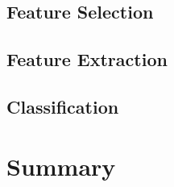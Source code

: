 \subsection{Feature Selection}

\subsection{Feature Extraction}

\subsection{Classification}

\section*{Summary}


